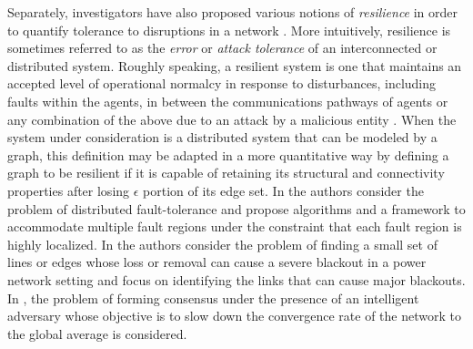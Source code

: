 \documentclass[reqno,8pt]{amsart}
\theoremstyle{definition}
\theoremstyle{remark}
\numberwithin{equation}{section}
\begin{document}
Separately, investigators have also proposed various notions of \textit{resilience} in order to quantify tolerance to disruptions in a network \cite{rieger_resilient_2009,sadamoto_weak_2016, biswas_resilient_2012,rieger_resilient_2012,garcia_resilient_2014,zeng_resilient_2014,Basar2012a,Basar2013,Wente2014,Basar2011}. More intuitively, resilience is sometimes referred to as the \textit{error} or \textit{attack tolerance}\cite{Chan2016} of an interconnected or distributed system. Roughly speaking, a resilient system is one that maintains an accepted level of operational normalcy in response to disturbances, including faults within the agents, in between the communications pathways of agents or any combination of the above due to an attack by a malicious entity \cite{rieger_resilient_2009}. When the system under consideration is a distributed system that can be modeled by a graph, this definition may be adapted in a more quantitative way by defining a graph to be resilient if it is capable of retaining its structural and connectivity properties after losing $\epsilon$ portion of its edge set. In \cite{Banerjee2009,Banerjee2011} the authors consider the problem of distributed fault-tolerance and propose algorithms and a framework to accommodate multiple fault regions under the constraint that each fault region is highly localized. In \cite{Pinar2010} the authors consider the problem of finding a small set of lines or edges whose loss or removal can cause a severe blackout in a power network setting and focus on identifying the links that can cause major blackouts. In \cite{Basar2012b}, the problem of forming consensus under the presence of an intelligent adversary whose objective is to slow down the convergence rate of the network to the global average is considered. 

\medskip
\end{document}
